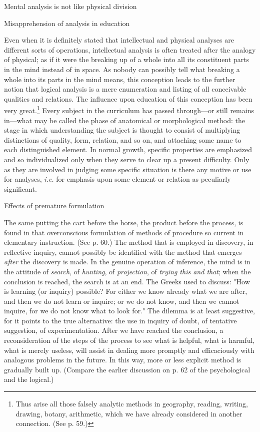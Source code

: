 \documentclass[letterpaper]{book}
\begin{document}
Mental analysis is not like physical division

Misapprehension of analysis in education

Even when it is definitely stated that intellectual and physical
analyses are different sorts of operations, intellectual analysis is
often treated after the analogy of physical; as if it were the breaking
up of a whole into all its constituent parts in the mind instead of in
space. As nobody can possibly tell what breaking a whole into its parts
in the mind means, this conception leads to the further notion that
logical analysis is a mere enumeration and listing of all conceivable
qualities and
relations.
The influence upon education of this conception has been very
great.\footnote{
Thus arise all those falsely analytic methods in geography, reading,
writing, drawing, botany, arithmetic, which we have already considered
in another connection. (See p. 59.)
}
Every subject in the curriculum has passed through---or still remains
in---what may be called the phase of anatomical or morphological method:
the stage in which understanding the subject is thought to consist of
multiplying distinctions of quality, form, relation, and so on, and
attaching some name to each distinguished element. In normal growth,
specific properties are emphasized and so individualized only when they
serve to clear up a present difficulty. Only as they are involved in
judging some specific situation is there any motive or use for analyses,
\emph{i.e.} for emphasis upon some element or relation as peculiarly
significant.

Effects of premature formulation

The same putting the cart before the horse, the product before the
process, is found in that overconscious formulation of methods of
procedure so current in elementary instruction. (See p. 60.) The method
that is employed in discovery, in reflective inquiry, cannot possibly be
identified with the method that emerges \emph{after} the discovery is
made. In the genuine operation of inference, the mind is in the attitude
of \emph{search}, of \emph{hunting}, of \emph{projection}, of
\emph{trying this and that}; when the conclusion is reached, the search
is at an end. The Greeks used to discuss: "How is learning (or inquiry)
possible? For either we know already what we are after, and then we do
not learn or inquire; or we do not know, and then we cannot inquire, for
we do not know what to look for." The dilemma is at least suggestive,
for it points to the true alternative: the use in inquiry of doubt, of
tentative suggestion, of
experimentation.
After we have reached the conclusion, a reconsideration of the steps of
the process to see what is helpful, what is harmful, what is merely
useless, will assist in dealing more promptly and efficaciously with
analogous problems in the future. In this way, more or less explicit
method is gradually built up. (Compare the earlier discussion on p. 62
of the psychological and the logical.)
\end{document}
